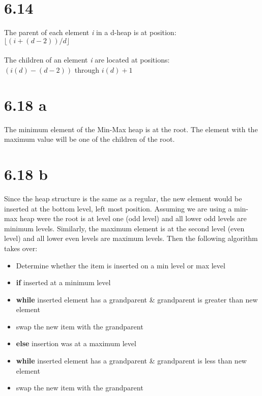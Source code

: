 \documentclass[12pt,letterpaper]{article}
\begin{document}
\section*{6.14}
The parent of each element \textit{i} in a d-heap is at position:\\ $\lfloor(i + (d - 2))/d\rfloor$\\\\
The children of an element \textit{i} are located at positions:\\ $(i(d) - (d-2))$ through $i(d) + 1$
\section*{6.18 a}
The minimum element of the Min-Max heap is at the root. The element with the maximum value will be one of the children of the root.
\section*{6.18 b}
Since the heap structure is the same as a regular, the new element would be inserted at the bottom level, left most position. Assuming we are using a min-max heap were the root is at level one (odd level) and all lower odd levels are minimum levels. Similarly, the maximum element is at the second level (even level) and all lower even levels are maximum levels. Then the following algorithm takes over:\\
\begin{itemize}
\item Determine whether the item is inserted on a min level or max level
\item \textbf{if} inserted at a minimum level
\item \hspace*{.5 in}\textbf{while} inserted element has a grandparent \& grandparent is \hspace*{.5 in}greater than new element
\item \hspace*{.5 in} swap the new item with the grandparent
\item \textbf{else} insertion was at a maximum level
\item \hspace*{.5 in}\textbf{while} inserted element has a grandparent \& grandparent is \hspace*{.5 in} less than new element
\item \hspace*{.5 in} swap the new item with the grandparent
\end{itemize}
\end{document}
